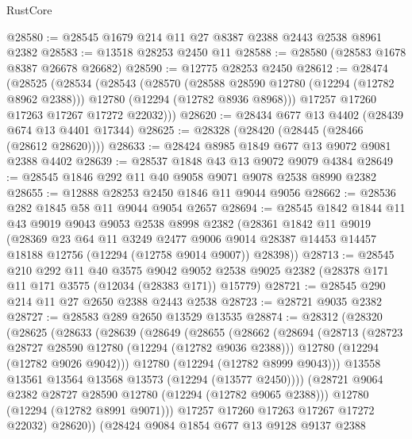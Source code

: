 \begin{lexlean}{RustCore}
\begin{coremodule}
@28580 := @28545 @1679 @214 @11 @27 @8387 @2388 @2443 @2538 @8961 @2382
@28583 := @13518 @28253 @2450 @11
@28588 := @28580 (@28583 @1678 @8387 @26678 @26682)
@28590 := @12775 @28253 @2450
@28612 := @28474
    (@28525
      (@28534
        (@28543
          (@28570
            (@28588 @28590 @12780 (@12294 (@12782 @8962 @2388)))
            @12780
            (@12294 (@12782 @8936 @8968)))
          @17257
          @17260
          @17263
          @17267
          @17272
          @22032)))
@28620 := @28434 @677 @13 @4402 (@28439 @674 @13 @4401 @17344)
@28625 := @28328 (@28420 (@28445 (@28466 (@28612 @28620))))
@28633 := @28424 @8985 @1849 @677 @13 @9072 @9081 @2388 @4402
@28639 := @28537 @1848 @43 @13 @9072 @9079 @4384
@28649 := @28545 @1846 @292 @11 @40 @9058 @9071 @9078 @2538 @8990 @2382
@28655 := @12888 @28253 @2450 @1846 @11 @9044 @9056
@28662 := @28536 @282 @1845 @58 @11 @9044 @9054 @2657
@28694 := @28545
    @1842
    @1844
    @11
    @43
    @9019
    @9043
    @9053
    @2538
    @8998
    @2382
    (@28361
      @1842
      @11
      @9019
      (@28369
        @23
        @64
        @11
        @3249
        @2477
        @9006
        @9014
        @28387
        @14453
        @14457
        @18188
        @12756
        (@12294 (@12758 @9014 @9007))
        @28398))
@28713 := @28545
    @210
    @292
    @11
    @40
    @3575
    @9042
    @9052
    @2538
    @9025
    @2382
    (@28378 @171 @11 @171 @3575 (@12034 (@28383 @171)) @15779)
@28721 := @28545 @290 @214 @11 @27 @2650 @2388 @2443 @2538
@28723 := @28721 @9035 @2382
@28727 := @28583 @289 @2650 @13529 @13535
@28874 := @28312
    (@28320
      (@28625
        (@28633
          (@28639
            (@28649
              (@28655
                (@28662
                  (@28694
                    (@28713
                      (@28723 @28727 @28590 @12780 (@12294 (@12782 @9036 @2388)))
                      @12780
                      (@12294 (@12782 @9026 @9042)))
                    @12780
                    (@12294 (@12782 @8999 @9043)))
                  @13558
                  @13561
                  @13564
                  @13568
                  @13573
                  (@12294 (@13577 @2450))))
              (@28721 @9064 @2382 @28727 @28590 @12780 (@12294 (@12782 @9065 @2388)))
              @12780
              (@12294 (@12782 @8991 @9071)))
            @17257
            @17260
            @17263
            @17267
            @17272
            @22032)
          @28620))
      (@28424
        @9084
        @1854
        @677
        @13
        @9128
        @9137
        @2388

\end{coremodule}
\end{lexlean}
